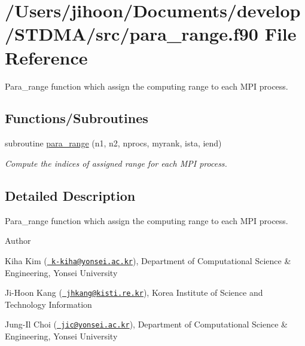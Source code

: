 \hypertarget{para__range_8f90}{}\section{/\+Users/jihoon/\+Documents/develop/\+S\+T\+D\+M\+A/src/para\+\_\+range.f90 File Reference}
\label{para__range_8f90}


Para\+\_\+range function which assign the computing range to each M\+PI process.  


\subsection*{Functions/\+Subroutines}
\begin{DoxyCompactItemize}
\item 
subroutine \mbox{\hyperlink{para__range_8f90_ab75ab386311975aa4ff7cac06798fcd4}{para\+\_\+range}} (n1, n2, nprocs, myrank, ista, iend)
\begin{DoxyCompactList}\small\item\em Compute the indices of assigned range for each M\+PI process. \end{DoxyCompactList}\end{DoxyCompactItemize}


\subsection{Detailed Description}
Para\+\_\+range function which assign the computing range to each M\+PI process. 

\begin{DoxyAuthor}{Author}

\end{DoxyAuthor}

\begin{DoxyItemize}
\item Kiha Kim (\href{mailto:k-kiha@yonsei.ac.kr}{\texttt{ k-\/kiha@yonsei.\+ac.\+kr}}), Department of Computational Science \& Engineering, Yonsei University
\item Ji-\/\+Hoon Kang (\href{mailto:jhkang@kisti.re.kr}{\texttt{ jhkang@kisti.\+re.\+kr}}), Korea Institute of Science and Technology Information
\item Jung-\/\+Il Choi (\href{mailto:jic@yonsei.ac.kr}{\texttt{ jic@yonsei.\+ac.\+kr}}), Department of Computational Science \& Engineering, Yonsei University
\end{DoxyItemize}

